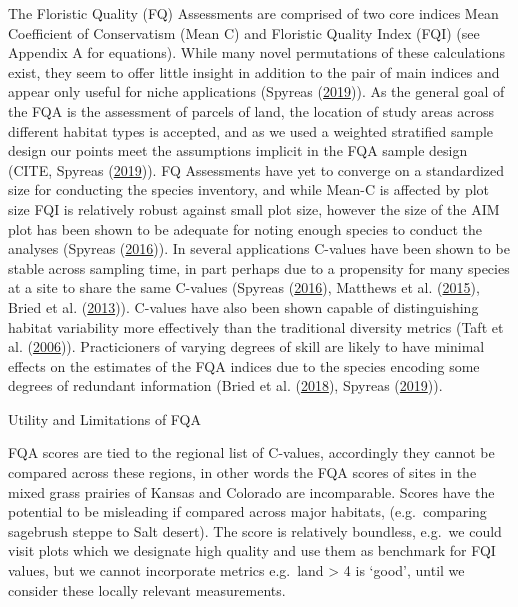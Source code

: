 \documentclass[
]{article}
\begin{document}
The Floristic Quality (FQ) Assessments are comprised of two core indices
Mean Coefficient of Conservatism (Mean C) and Floristic Quality Index
(FQI) (see Appendix A for equations). While many novel permutations of
these calculations exist, they seem to offer little insight in addition
to the pair of main indices and appear only useful for niche
applications (Spyreas
(\protect\hyperlink{ref-spyreas2019floristic}{2019})). As the general
goal of the FQA is the assessment of parcels of land, the location of
study areas across different habitat types is accepted, and as we used a
weighted stratified sample design our points meet the assumptions
implicit in the FQA sample design (CITE, Spyreas
(\protect\hyperlink{ref-spyreas2019floristic}{2019})). FQ Assessments
have yet to converge on a standardized size for conducting the species
inventory, and while Mean-C is affected by plot size FQI is relatively
robust against small plot size, however the size of the AIM plot has
been shown to be adequate for noting enough species to conduct the
analyses (Spyreas (\protect\hyperlink{ref-spyreas2016scale}{2016})). In
several applications C-values have been shown to be stable across
sampling time, in part perhaps due to a propensity for many species at a
site to share the same C-values (Spyreas
(\protect\hyperlink{ref-spyreas2016scale}{2016}), Matthews et al.
(\protect\hyperlink{ref-matthews2015null}{2015}), Bried et al.
(\protect\hyperlink{ref-bried2013floristic}{2013})). C-values have also
been shown capable of distinguishing habitat variability more
effectively than the traditional diversity metrics (Taft et al.
(\protect\hyperlink{ref-taft2006estimating}{2006})). Practicioners of
varying degrees of skill are likely to have minimal effects on the
estimates of the FQA indices due to the species encoding some degrees of
redundant information (Bried et al.
(\protect\hyperlink{ref-bried2018experts}{2018}), Spyreas
(\protect\hyperlink{ref-spyreas2019floristic}{2019})).

Utility and Limitations of FQA

FQA scores are tied to the regional list of C-values, accordingly they
cannot be compared across these regions, in other words the FQA scores
of sites in the mixed grass prairies of Kansas and Colorado are
incomparable. Scores have the potential to be misleading if compared
across major habitats, (e.g.~comparing sagebrush steppe to Salt desert).
The score is relatively boundless, e.g.~we could visit plots which we
designate high quality and use them as benchmark for FQI values, but we
cannot incorporate metrics e.g.~land \textgreater{} 4 is `good', until
we consider these locally relevant measurements.
\end{document}
